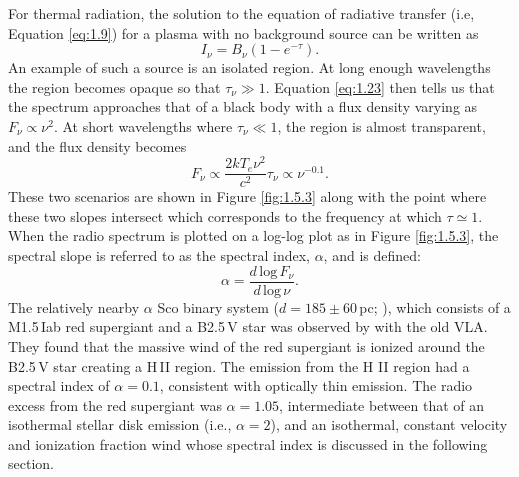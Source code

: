 For thermal radiation, the solution to the equation of radiative transfer (i.e, Equation \ref{eq:1.9}) for a plasma with no background source can be written as 
\begin{equation}\label{eq:1.23}
I_{\nu} = B_{\nu}(1-e^{-\tau}).
\end{equation}
An example of such a source is an isolated  region. At long enough wavelengths the  region becomes opaque so that $\tau _{\nu} \gg 1$. Equation \ref{eq:1.23} then tells us that the spectrum approaches that of a black body with a flux density varying as $F_{\nu} \propto \nu ^{2}$. At short wavelengths where $\tau _{\nu} \ll 1$, the  region is almost transparent, and the flux density becomes
\begin{equation}
F_{\nu} \propto \frac{2kT_{e}\nu ^2}{c^2}\tau _{\nu} \propto \nu ^{-0.1}.
\end{equation}
These two scenarios are shown in Figure \ref{fig:1.5.3} along with the point where these two slopes intersect which corresponds to the frequency at which $\tau \simeq 1$. When the radio spectrum is plotted on a log-log plot as in Figure \ref{fig:1.5.3}, the spectral slope is referred to as the spectral index, $\alpha$, and is defined:
\begin{equation}
\alpha = \frac{d\,\mathrm{log}\,F_{\nu}}{d\,\mathrm{log}\,\nu}.
\end{equation}
The relatively nearby $\alpha$ Sco binary system ($d=185\pm 60$\,pc; \citealt{perryman_1997}), which consists of a M1.5\,Iab red supergiant and a B2.5\,V star was observed by \cite{hjellming_1983} with the old VLA. They found that the massive wind of the red supergiant is ionized around the B2.5\,V star creating a H\,II region. The emission from the H II region had a spectral index of $\alpha = 0.1$, consistent with optically thin emission. The radio excess from the red supergiant was $\alpha = 1.05$, intermediate between that of an isothermal stellar disk emission (i.e., $\alpha = 2$), and an isothermal, constant velocity and ionization fraction wind whose spectral index is discussed in the following section.



